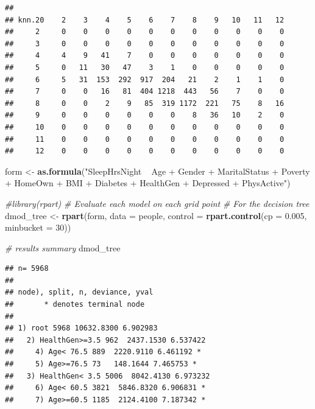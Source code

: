\documentclass[]{article}
\newenvironment{Shaded}{\begin{snugshade}}{\end{snugshade}}
\newcommand{\KeywordTok}[1]{\textcolor[rgb]{0.13,0.29,0.53}{\textbf{{#1}}}}
\newcommand{\DataTypeTok}[1]{\textcolor[rgb]{0.13,0.29,0.53}{{#1}}}
\newcommand{\DecValTok}[1]{\textcolor[rgb]{0.00,0.00,0.81}{{#1}}}
\newcommand{\FloatTok}[1]{\textcolor[rgb]{0.00,0.00,0.81}{{#1}}}
\newcommand{\StringTok}[1]{\textcolor[rgb]{0.31,0.60,0.02}{{#1}}}
\newcommand{\CommentTok}[1]{\textcolor[rgb]{0.56,0.35,0.01}{\textit{{#1}}}}
\newcommand{\NormalTok}[1]{{#1}}
\begin{document}
\begin{verbatim}
##       
## knn.20    2    3    4    5    6    7    8    9   10   11   12
##     2     0    0    0    0    0    0    0    0    0    0    0
##     3     0    0    0    0    0    0    0    0    0    0    0
##     4     4    9   41    7    0    0    0    0    0    0    0
##     5     0   11   30   47    3    1    0    0    0    0    0
##     6     5   31  153  292  917  204   21    2    1    1    0
##     7     0    0   16   81  404 1218  443   56    7    0    0
##     8     0    0    2    9   85  319 1172  221   75    8   16
##     9     0    0    0    0    0    0    8   36   10    2    0
##     10    0    0    0    0    0    0    0    0    0    0    0
##     11    0    0    0    0    0    0    0    0    0    0    0
##     12    0    0    0    0    0    0    0    0    0    0    0
\end{verbatim}

\begin{Shaded}
\begin{Highlighting}[]
\NormalTok{form <-}\StringTok{ }\KeywordTok{as.formula}\NormalTok{(}\StringTok{"SleepHrsNight ~ Age + Gender + MaritalStatus + }
\StringTok{                   Poverty + HomeOwn + BMI + Diabetes + HealthGen + }
\StringTok{                   Depressed + PhysActive"}\NormalTok{)}

\CommentTok{#library(rpart)}
\CommentTok{# Evaluate each model on each grid point}
\CommentTok{# For the decision tree}
\NormalTok{dmod_tree <-}\StringTok{ }\KeywordTok{rpart}\NormalTok{(form, }\DataTypeTok{data =} \NormalTok{people, }
                   \DataTypeTok{control =} \KeywordTok{rpart.control}\NormalTok{(}\DataTypeTok{cp =} \FloatTok{0.005}\NormalTok{, }\DataTypeTok{minbucket =} \DecValTok{30}\NormalTok{))}

\CommentTok{# results summary}
\NormalTok{dmod_tree}
\end{Highlighting}
\end{Shaded}

\begin{verbatim}
## n= 5968 
## 
## node), split, n, deviance, yval
##       * denotes terminal node
## 
## 1) root 5968 10632.8300 6.902983  
##   2) HealthGen>=3.5 962  2437.1530 6.537422  
##     4) Age< 76.5 889  2220.9110 6.461192 *
##     5) Age>=76.5 73   148.1644 7.465753 *
##   3) HealthGen< 3.5 5006  8042.4130 6.973232  
##     6) Age< 60.5 3821  5846.8320 6.906831 *
##     7) Age>=60.5 1185  2124.4100 7.187342 *
\end{verbatim}
\end{document}

